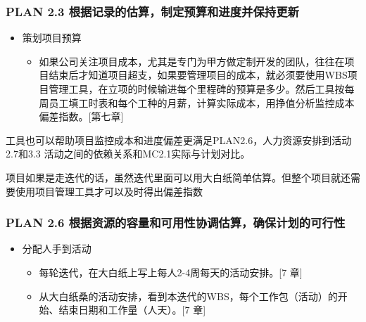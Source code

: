 \hypertarget{plan-2.3-ux6839ux636eux8bb0ux5f55ux7684ux4f30ux7b97ux5236ux5b9aux9884ux7b97ux548cux8fdbux5ea6ux5e76ux4fddux6301ux66f4ux65b0}{%
\subsubsection{PLAN 2.3
根据记录的估算，制定预算和进度并保持更新}\label{plan-2.3-ux6839ux636eux8bb0ux5f55ux7684ux4f30ux7b97ux5236ux5b9aux9884ux7b97ux548cux8fdbux5ea6ux5e76ux4fddux6301ux66f4ux65b0}}

\begin{itemize}
\tightlist
\item
  策划项目预算

  \begin{itemize}
  \tightlist
  \item
    如果公司关注项目成本，尤其是专门为甲方做定制开发的团队，往往在项目结束后才知道项目超支，如果要管理项目的成本，就必须要使用WBS项目管理工具，在立项的时候输进每个里程碑的预算是多少。然后工具按每周员工填工时表和每个工种的月薪，计算实际成本，用挣值分析监控成本偏差指数。{[}第七章{]}
  \end{itemize}
\end{itemize}

工具也可以帮助项目监控成本和进度偏差更满足PLAN2.6，人力资源安排到活动2.7和3.3
活动之间的依赖关系和MC2.1实际与计划对比。

项目如果是走迭代的话，虽然迭代里面可以用大白纸简单估算。但整个项目就还需要使用项目管理工具才可以及时得出偏差指数

\hypertarget{plan-2.6-ux6839ux636eux8d44ux6e90ux7684ux5bb9ux91cfux548cux53efux7528ux6027ux534fux8c03ux4f30ux7b97ux786eux4fddux8ba1ux5212ux7684ux53efux884cux6027}{%
\subsubsection{PLAN 2.6
根据资源的容量和可用性协调估算，确保计划的可行性}\label{plan-2.6-ux6839ux636eux8d44ux6e90ux7684ux5bb9ux91cfux548cux53efux7528ux6027ux534fux8c03ux4f30ux7b97ux786eux4fddux8ba1ux5212ux7684ux53efux884cux6027}}

\begin{itemize}
\tightlist
\item
  分配人手到活动

  \begin{itemize}
  \tightlist
  \item
    每轮迭代，在大白纸上写上每人2-4周每天的活动安排。{[}7 章{]}
  \item
    从大白纸桑的活动安排，看到本迭代的WBS，每个工作包（活动）的开始、结束日期和工作量（人天）。{[}7
    章{]}
  \end{itemize}
\end{itemize}

